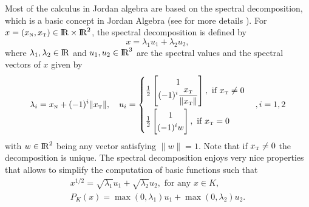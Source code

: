 Most of the calculus in Jordan algebra are based on the spectral decomposition, which is a basic concept in Jordan Algebra (see for more details \cite{Fukushima.ea2001}). For $x = (x_{\hbox{\tiny{N}}}, x_{\hbox{\tiny{T}}})\in \mathrm{I\!R}\times \mathrm{I\!R}^2$, the spectral decomposition is defined by
\begin{equation}
  \label{eq:Jordan-spectraldecomposition}
  x = \lambda_1 u_1 + \lambda_2 u_2,
\end{equation}
where $\lambda_1,\lambda_2\in \mathrm{I\!R}$ and $u_1,u_2\in\mathrm{I\!R}^3$ are the spectral values and the spectral vectors of $x$ given by
\begin{equation}
  \label{eq:Jordan-spectraldecomposition1}
    \lambda_i= x_\n + (-1)^i \|x_\t\|, \quad
    u_i =
    \begin{cases}
      \frac{1}{2}
      \begin{bmatrix}
        1 \\
        (-1)^i \Frac{x_\t}{\|x_\t\|}
      \end{bmatrix}, \text{ if } x_\t\neq 0 \\[5mm]
       \frac{1}{2}
      \begin{bmatrix}
        1 \\
        (-1)^i w
      \end{bmatrix}, \text{ if } x_\t = 0 \\
    \end{cases}, i = 1,2
\end{equation}
with $w\in\mathrm{I\!R}^2$ being any vector satisfying $\|w\|=1$. Note that if $x_{\hbox{\tiny{T}}}\neq 0$ the decomposition is unique. The spectral decomposition enjoys very nice properties that  allows to simplify  the computation of basic functions such that
\begin{equation}
  \label{eq:Jordan-spectraldecomposition2}
  \begin{array}{l}
    x^{1/2} = \sqrt{\lambda_1} u_1 + \sqrt{\lambda_2} u_2, \text{ for any }  x \in K, \\[1mm]
    P_K(x) = \max(0,\lambda_1) u_1 + \max(0,\lambda_2) u_2. 
  \end{array}
\end{equation}




